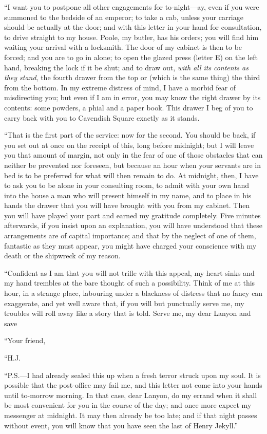\documentclass[12pt,openright]{book}
\begin{document}
“I want you to postpone all other engagements for to-night—ay, even if you were summoned to the bedside of an emperor; to take a cab, unless your carriage should be actually at the door; and with this letter in your hand for consultation, to drive straight to my house. Poole, my butler, has his orders; you will find him waiting your arrival with a locksmith. The door of my cabinet is then to be forced; and you are to go in alone; to open the glazed press (letter E) on the left hand, breaking the lock if it be shut; and to draw out, \textit{with all its}\textit{ }\textit{contents as they stand}, the fourth drawer from the top or (which is the same thing) the third from the bottom. In my extreme distress of mind, I have a morbid fear of misdirecting you; but even if I am in error, you may know the right drawer by its contents: some powders, a phial and a paper book. This drawer I beg of you to carry back with you to Cavendish Square exactly as it stands.

“That is the first part of the service: now for the second. You should be back, if you set out at once on the receipt of this, long before midnight; but I will leave you that amount of margin, not only in the fear of one of those obstacles that can neither be prevented nor foreseen, but because an hour when your servants are in bed is to be preferred for what will then remain to do. At midnight, then, I have to ask you to be alone in your consulting room, to admit with your own hand into the house a man who will present himself in my name, and to place in his hands the drawer that you will have brought with you from my cabinet. Then you will have played your part and earned my gratitude completely. Five minutes afterwards, if you insist upon an explanation, you will have understood that these arrangements are of capital importance; and that by the neglect of one of them, fantastic as they must appear, you might have charged your conscience with my death or the shipwreck of my reason.

“Confident as I am that you will not trifle with this appeal, my heart sinks and my hand trembles at the bare thought of such a possibility. Think of me at this hour, in a strange place, labouring under a blackness of distress that no fancy can exaggerate, and yet well aware that, if you will but punctually serve me, my troubles will roll away like a story that is told. Serve me, my dear Lanyon and save

“Your friend,

“H.J.

“P.S.—I had already sealed this up when a fresh terror struck upon my soul. It is possible that the post-office may fail me, and this letter not come into your hands until to-morrow morning. In that case, dear Lanyon, do my errand when it shall be most convenient for you in the course of the day; and once more expect my messenger at midnight. It may then already be too late; and if that night passes without event, you will know that you have seen the last of Henry Jekyll.”
\end{document}
